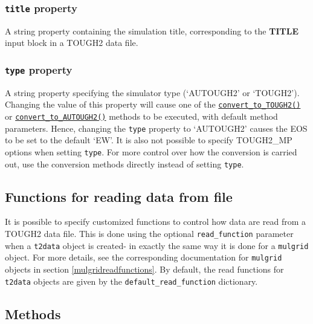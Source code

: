 \begin{snugshade}
\subsubsection{\texttt{title} property}
\end{snugshade}
\label{sec:t2data:title}

A string property containing the simulation title, corresponding to the \textbf{TITLE} input block in a TOUGH2 data file.

\begin{snugshade}
\subsubsection{\texttt{type} property}
\end{snugshade}
\label{sec:t2data:type}

A string property specifying the simulator type (`AUTOUGH2' or `TOUGH2').  Changing the value of this property will cause one of the \hyperref[sec:t2data:convert_to_TOUGH2]{\texttt{convert\_to\_TOUGH2()}} or \hyperref[sec:t2data:convert_to_AUTOUGH2]{\texttt{convert\_to\_AUTOUGH2()}} methods to be executed, with default method parameters.  Hence, changing the \texttt{type} property to `AUTOUGH2' causes the EOS to be set to the default `EW'.  It is also not possible to specify TOUGH2\_MP options when setting \texttt{type}.  For more control over how the conversion is carried out, use the conversion methods directly instead of setting \texttt{type}.

\subsection{Functions for reading data from file}

It is possible to specify customized functions to control how data are read from a TOUGH2 data file. This is done using the optional \texttt{read\_function} parameter when a \texttt{t2data} object is created- in exactly the same way it is done for a \texttt{mulgrid} object. For more details, see the corresponding documentation for \texttt{mulgrid} objects in section \ref{mulgridreadfunctions}. By default, the read functions for \texttt{t2data} objects are given by the \texttt{default\_read\_function} dictionary.

\subsection{Methods}

